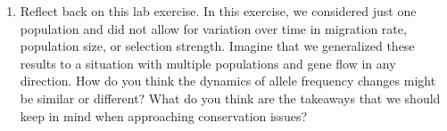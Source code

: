 \begin{enumerate}
  Trial

  N

  p0

  toggledrift (\# runs)

  wA1A1

  wA1A2

  wA2A2

  pm

  m

  Description

  4a

  500

  0.1

  1-10

  1

  0.9

  0.8

  0.6

  0.035

  N = 500

  4b

  100

  0.1

  1-10

  1

  0.9

  0.8

  0.6

  0.035

  N = 100

  4c

  50

  0.1

  1-10

  1

  0.9

  0.8

  0.6

  0.035

  N = 50

  4d

  25

  0.1

  1-10

  1

  0.9

  0.8

  0.6

  0.035

  N = 25
\item
  Reflect back on this lab exercise. In this exercise, we considered
  just one population and did not allow for variation over time in
  migration rate, population size, or selection strength. Imagine that
  we generalized these results to a situation with multiple populations
  and gene flow in any direction. How do you think the dynamics of
  allele frequency changes might be similar or different? What do you
  think are the takeaways that we should keep in mind when approaching
  conservation issues?
\end{enumerate}

